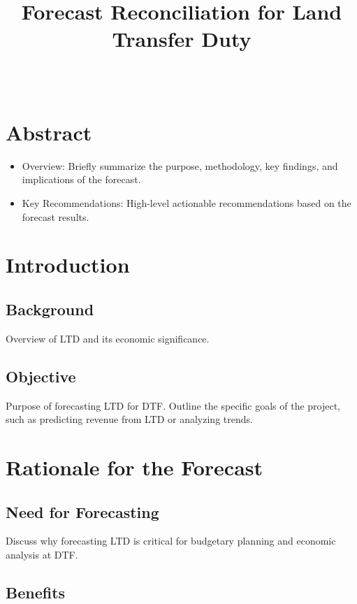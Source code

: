 \documentclass[11pt,a4paper,]{article}
\title{Forecast Reconciliation for Land Transfer Duty}
\author{\sf{\Large\textbf{Hoang Do}\\\large Monash University\\[0.5cm]}}
\date{\sf\Date~\Month~\Year}
\makeatletter
\providecommand{\tightlist}{%
  \setlength{\itemsep}{0pt}\setlength{\parskip}{0pt}}
\def\titlepage{\front{\expandafter{\@title}}{\@author}{\@organization}}
\makeatother
\begin{document}
\titlepage

{
\setcounter{tocdepth}{2}
\tableofcontents
}
\section{Abstract}\label{abstract}

\begin{itemize}
\tightlist
\item
  Overview: Briefly summarize the purpose, methodology, key findings, and implications of the forecast.
\item
  Key Recommendations: High-level actionable recommendations based on the forecast results.
\end{itemize}

\section{Introduction}\label{introduction}

\subsection{Background}\label{background}

Overview of LTD and its economic significance.

\subsection{Objective}\label{objective}

Purpose of forecasting LTD for DTF. Outline the specific goals of the project, such as predicting revenue from LTD or analyzing trends.

\section{Rationale for the Forecast}\label{rationale-for-the-forecast}

\subsection{Need for Forecasting}\label{need-for-forecasting}

Discuss why forecasting LTD is critical for budgetary planning and economic analysis at DTF.

\subsection{Benefits}\label{benefits}
\end{document}
